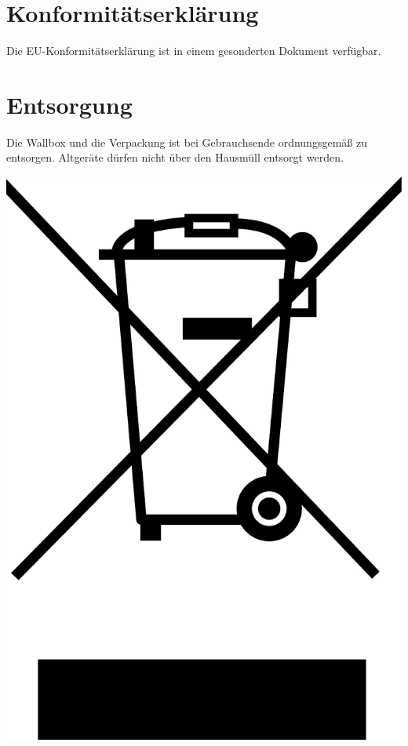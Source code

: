 \documentclass[a4paper,10pt]{article}
\begin{document}
\begin{multicols*}{2}
	\section{Konformitätserklärung}
	Die EU-Konformitätserklärung ist in einem gesonderten Dokument verfügbar.

	\section{Entsorgung}
	\begin{minipage}{0.35\textwidth}
		Die Wallbox und die Verpackung ist bei Gebrauchsende ordnungsgemäß zu
		entsorgen. Altgeräte dürfen nicht über den Hausmüll entsorgt werden.
	\end{minipage}\hfill
	\begin{minipage}{0.1\textwidth}
		\includegraphics[width=\linewidth]{./img/resized/weee.pdf}
	\end{minipage}


\end{multicols*}
\end{document}
